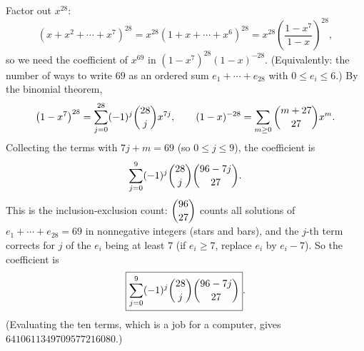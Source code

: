 Factor out $x^{28}$:
\[\left(x+x^2+\cdots+x^7\right)^{28}=x^{28}\left(1+x+\cdots+x^6\right)^{28}=x^{28}\left(\dfrac{1-x^7}{1-x}\right)^{28},\]
so we need the coefficient of $x^{69}$ in $\left(1-x^7\right)^{28}(1-x)^{-28}$. (Equivalently: the number of ways to write $69$ as an ordered sum $e_1+\cdots+e_{28}$ with $0\le e_i\le6$.) By the binomial theorem,
\[\left(1-x^7\right)^{28}=\sum_{j=0}^{28}(-1)^j\dbinom{28}{j}x^{7j},\qquad(1-x)^{-28}=\sum_{m\ge0}\dbinom{m+27}{27}x^m .\]
Collecting the terms with $7j+m=69$ (so $0\le j\le9$), the coefficient is
\[\sum_{j=0}^{9}(-1)^j\dbinom{28}{j}\dbinom{96-7j}{27}.\]
This is the inclusion-exclusion count: $\dbinom{96}{27}$ counts all solutions of $e_1+\cdots+e_{28}=69$ in nonnegative integers (stars and bars), and the $j$-th term corrects for $j$ of the $e_i$ being at least $7$ (if $e_i\ge7$, replace $e_i$ by $e_i-7$). So the coefficient is
\[\boxed{\sum_{j=0}^{9}(-1)^j\dbinom{28}{j}\dbinom{96-7j}{27}}.\]
(Evaluating the ten terms, which is a job for a computer, gives $6410611349709577216080$.)
